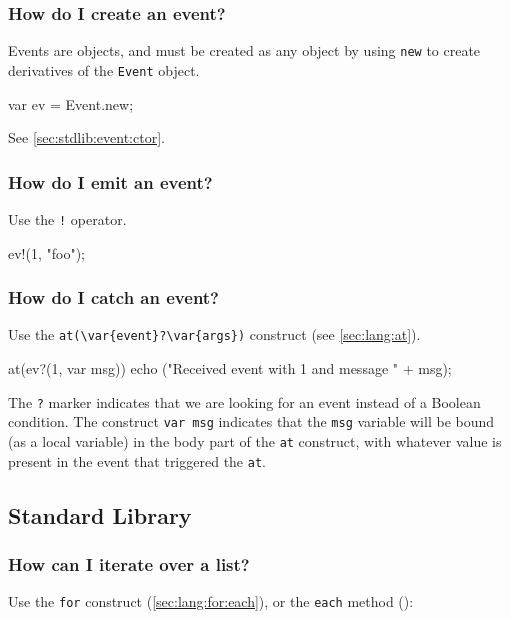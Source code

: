 \subsubsection{How do I create an event?}
Events are objects, and must be created as any object by using
\lstinline{new} to create derivatives of the \lstinline{Event} object.

\begin{urbiunchecked}
var ev = Event.new;
\end{urbiunchecked}

See \autoref{sec:stdlib:event:ctor}.

\subsubsection{How do I emit an event?}
Use the \lstinline|!| operator.

\begin{urbiunchecked}
ev!(1, "foo");
\end{urbiunchecked}

\subsubsection{How do I catch an event?}
Use the \lstinline|at(\var{event}?\var{args})| construct (see
\autoref{sec:lang:at}).

\begin{urbiunchecked}
at(ev?(1, var msg))
  echo ("Received event with 1 and message " + msg);
\end{urbiunchecked}

The \lstinline{?} marker indicates that we are looking for an event
instead of a Boolean condition. The construct \lstinline{var msg}
indicates that the \lstinline{msg} variable will be bound (as a local
variable) in the body part of the \lstinline{at} construct, with
whatever value is present in the event that triggered the
\lstinline{at}.

\subsection{Standard Library}

\subsubsection{How can I iterate over a list?}
Use the \lstinline{for} construct (\autoref{sec:lang:for:each}), or
the \lstinline|each| method ():

